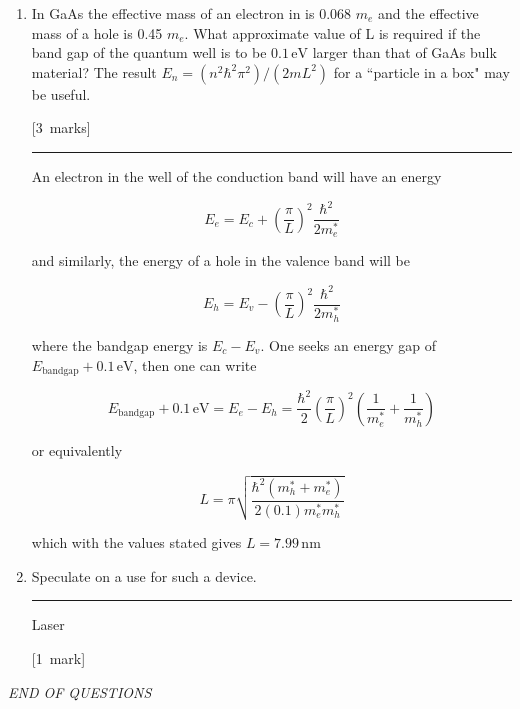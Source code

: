 \documentclass[12pt,a4paper]{article}
\newcommand{\unit}[1]{\ensuremath{\, \mathrm{#1}}}
\newcommand{\sepline}[0]{\par \hfil\rule{10cm}{0.4pt} \vspace*{\parskip}\hfil}
\begin{document}
\begin{enumerate}
\begin{enumerate}
\begin{enumerate}
\begin{answer}
						\end{answer}

						\item In GaAs the effective mass of an electron in is 0.068 $m_e$ and the effective mass of a hole is 0.45 $m_e$. What approximate value of L is required if the band gap of the quantum well is to be $0.1\unit{eV}$ larger than that of GaAs bulk material? The result $E_n = (n^2 \hbar^2 \pi^2)/(2 m L^2)$ for a ``particle in a box" may be useful.

						\hfill{[3~marks]}

						\begin{answer}

							\sepline

							An electron in the well of the conduction band will have an energy

							$$
							E_e = E_c + \left(\frac{\pi}{L}\right)^2 \frac{\hbar^2}{2m_e^*}
							$$

							and similarly, the energy of a hole in the valence band will be

							$$
							E_h = E_v - \left(\frac{\pi}{L}\right)^2 \frac{\hbar^2}{2m_h^*}
							$$

							where the bandgap energy is $E_c - E_v$. One seeks an energy gap of $E_{\mathrm{bandgap}} + 0.1 \unit{eV}$, then one can write

							$$
							E_{\mathrm{bandgap}} + 0.1 \unit{eV} = E_e - E_h = \frac{\hbar^2}{2}\left(\frac{\pi}{L}\right)^2\left(\frac{1}{m_e^*} + \frac{1}{m_h^*}\right)
							$$

							or equivalently

							$$
							L = \pi\sqrt{\frac{\hbar^2 (m_h^* + m_e^*)}{2 (0.1) m_e^* m_h^*}}
							$$

							which with the values stated gives $L = 7.99\unit{nm}$

						\end{answer}

						\item Speculate on a use for such a device.

						\begin{answer}

							\sepline

							Laser

						\end{answer}

						\hfill{[1~mark]}
					\end{enumerate}
				\end{enumerate}
			\vfill \centerline{\textit{END OF QUESTIONS}} \newpage
			\end{enumerate}
\end{document}

